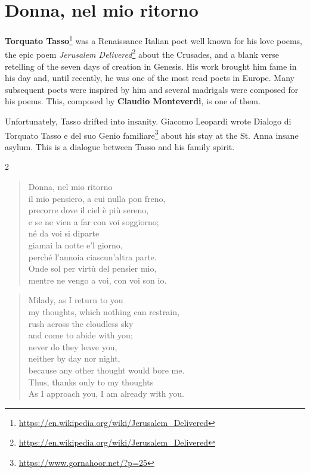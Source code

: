 \section{Donna, nel mio ritorno}

\textbf{Torquato Tasso}\footnote{\url{https://en.wikipedia.org/wiki/Jerusalem\_Delivered}} was a Renaissance Italian poet well known for his love poems, the epic poem \emph{Jerusalem Delivered}\footnote{\url{https://en.wikipedia.org/wiki/Jerusalem\_Delivered}} about the Crusades, and a blank verse retelling of the seven days of creation in Genesis. His work brought him fame in his day and, until recently, he was one of the most read poets in Europe. Many subsequent poets were inspired by him and several madrigals were composed for his poems. This, composed by \textbf{Claudio Monteverdi}, is one of them.

Unfortunately, Tasso drifted into insanity. Giacomo Leopardi wrote Dialogo di Torquato Tasso e del suo Genio familiare\footnote{\url{https://www.gornahoor.net/?p=25}} about his stay at the St. Anna insane asylum. This is a dialogue between Tasso and his family spirit.

\begin{paracol}{2}
\begin{verse}
Donna, nel mio ritorno\\
il mio pensiero, a cui nulla pon freno,\\
precorre dove il ciel è più sereno,\\
e se ne vien a far con voi soggiorno;\\
né da voi si diparte\\
giamai la notte e'l giorno,\\
perché l'annoia ciascun'altra parte.\\
Onde sol per virtù del pensier mio,\\
mentre ne vengo a voi, con voi son io.
\end{verse}
\switchcolumn
\begin{verse}
Milady, as I return to you\\
my thoughts, which nothing can restrain,\\
rush across the cloudless sky\\
and come to abide with you;\\
never do they leave you,\\
neither by day nor night,\\
because any other thought would bore me.\\
Thus, thanks only to my thoughts\\
As I approach you, I am already with you.
\end{verse}
\end{paracol}

